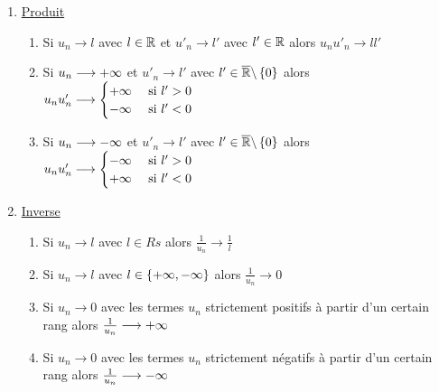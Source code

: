 \begin{defprop}
\begin{enumerate}
        \item \underline{Produit} 
            \begin{enumerate}
                \item Si \(u_n \to l\) avec \(l \in \mathbb{R}\) et \(u'_n \to l'\) avec \(l' \in \mathbb{R}\) alors \(u_n u'_n \to ll'\)
                \item Si \(u_n \longrightarrow +\infty\) et \(u'_n \to l'\) avec \(l' \in \overline{\mathbb{R}} \backslash \left\lbrace 0\right\rbrace\) alors \(u_n u'_n \longrightarrow \begin{cases}
                    +\infty &\text{ si } l' > 0 \\
                    -\infty &\text{ si } l'<0
                \end{cases}\)
                \item Si \(u_n \longrightarrow -\infty\) et \(u'_n \to l'\) avec \(l' \in \overline{\mathbb{R}} \backslash \left\lbrace0\right\rbrace\) alors \(u_n u'_n \longrightarrow \begin{cases}
                    -\infty &\text{ si } l'> 0 \\
                    +\infty &\text{ si } l' < 0 
                \end{cases}\)
            \end{enumerate}
        \item \underline{Inverse}
            \begin{enumerate}
                \item Si \(u_n \to l\) avec \( l \in Rs\) alors \(\frac{1}{u_n} \to \frac{1}{l}\)
                \item Si \(u_n \to l\) avec \( l\in \left\lbrace+\infty, -\infty\right\rbrace\) alors \(\frac{1}{u_n} \to 0\)
                \item Si \(u_n \to 0\) avec les termes \(u_n\) strictement positifs à partir d'un certain rang alors \(\frac{1}{u_n}\longrightarrow +\infty\)
                \item Si \(u_n \to 0\) avec les termes \(u_n\) strictement négatifs à partir d'un certain rang alors \(\frac{1}{u_n} \longrightarrow -\infty\)
            \end{enumerate}
    \end{enumerate}
\end{defprop}


